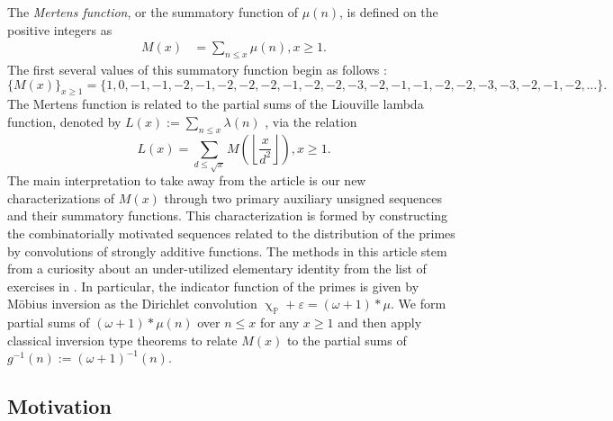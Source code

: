 \documentclass[11pt,reqno,a4letter]{article}
\numberwithin{figure}{section}
\numberwithin{table}{section}
\newcommand{\cf}{\textit{cf.\ }}
\newcommand{\seqnum}[1]{\href{http://oeis.org/#1}{\color{ProcessBlue}{\underline{#1}}}}
\renewcommand{\chi}{\upchi}
\newcommand{\Floor}[2]{\ensuremath{\left\lfloor \frac{#1}{#2} \right\rfloor}}
\theoremstyle{plain}
\numberwithin{theorem}{section}
\theoremstyle{definition}
\begin{document}
The \emph{Mertens function}, or the summatory function of $\mu(n)$, is defined on the 
positive integers as 
\begin{align*} 
M(x) & = \sum_{n \leq x} \mu(n), x \geq 1. 
\end{align*} 
The first several values of this 
summatory function begin as follows \cite[\seqnum{A008683}; \seqnum{A002321}]{OEIS}: 
\[
\{M(x)\}_{x \geq 1} = \{1, 0, -1, -1, -2, -1, -2, -2, -2, -1, -2, -2, -3, -2, 
     -1, -1, -2, -2, -3, -3, -2, -1, -2, \ldots\}. 
\] 
The Mertens function is related 
to the partial sums of the Liouville lambda function, 
denoted by $L(x) := \sum_{n \leq x} \lambda(n)$ 
\cite[\seqnum{A008836}]{OEIS}, 
via the relation \cite{HUMPHRIES-JNT-2013,LEHMAN-1960} 
\[
L(x) = \sum_{d \leq \sqrt{x}} M\left(\Floor{x}{d^2}\right), x \geq 1. 
\] 
The main interpretation to take away from the article is 
our new characterizations of $M(x)$ through two primary 
auxiliary unsigned sequences and their 
summatory functions. This characterization is formed by constructing the 
combinatorially motivated sequences related to the distribution of the primes 
by convolutions of strongly additive functions. 
The methods in this article stem from a 
curiosity about an under-utilized elementary identity from 
the list of exercises in \cite[\S 2; \cf \S 11]{APOSTOLANUMT}. 
In particular, the indicator function of the primes is given by M\"obius inversion as the 
Dirichlet convolution $\chi_{\mathbb{P}} + \varepsilon = (\omega + 1) \ast \mu$. 
We form partial sums of $(\omega + 1) \ast \mu(n)$ over $n \leq x$ for 
any $x \geq 1$ and then apply classical inversion type theorems to relate  
$M(x)$ to the partial sums of $g^{-1}(n) := (\omega+1)^{-1}(n)$. 

\subsection{Motivation} 
\end{document}
